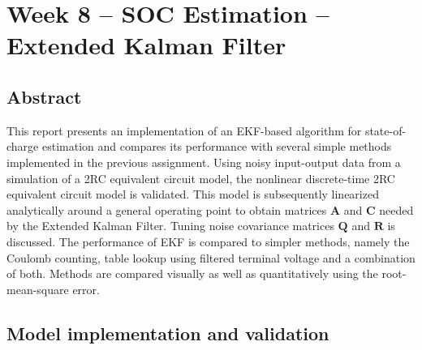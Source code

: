 
\chapter{Week 8 -- SOC Estimation -- Extended Kalman Filter}

\section{Abstract}
This report presents an implementation of an EKF-based algorithm for state-of-charge estimation and compares its performance with several simple methods implemented in the previous assignment. Using noisy input-output data from a simulation of a 2RC equivalent circuit model,
the nonlinear discrete-time 2RC equivalent circuit model is validated. This model is subsequently linearized analytically around a general operating point to obtain matrices $\mathbf{A}$ and $\mathbf{C}$ needed by the Extended Kalman Filter. Tuning noise covariance matrices $\mathbf{Q}$ and $\mathbf{R}$ is discussed. The performance of EKF is compared to simpler methods, namely the Coulomb counting, table lookup using filtered terminal voltage and a combination of both. Methods are compared visually as well as quantitatively using the root-mean-square error.

\section{Model implementation and validation}
\label{sec:8-one}

